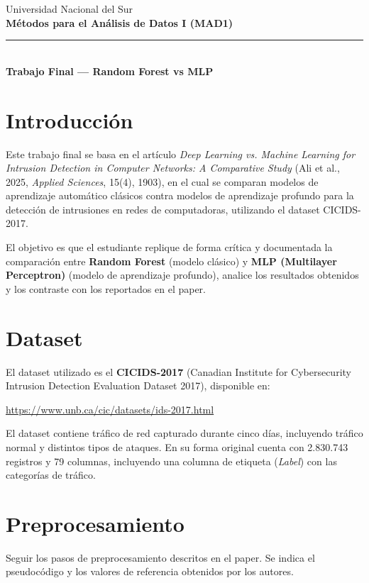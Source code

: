 \documentclass[11pt,a4paper]{article}
\begin{document}
\begin{center}
    {\color{azulUNS}\small Universidad Nacional del Sur}\\[2pt]
    {\color{azulUNS}\Large\bfseries M\'etodos para el An\'alisis de Datos I (MAD1)}\\[6pt]
    {\color{azulUNS}\rule{\textwidth}{1.2pt}}\\[8pt]
    {\Large\bfseries Trabajo Final --- Random Forest vs MLP}
\end{center}

\vspace{1em}

\section{Introducci\'on}
Este trabajo final se basa en el art\'iculo \textit{Deep Learning vs. Machine Learning for Intrusion Detection in Computer Networks: A Comparative Study} (Ali et al., 2025, \textit{Applied Sciences}, 15(4), 1903), en el cual se comparan modelos de aprendizaje autom\'atico cl\'asicos contra modelos de aprendizaje profundo para la detecci\'on de intrusiones en redes de computadoras, utilizando el dataset CICIDS-2017.

El objetivo es que el estudiante replique de forma cr\'itica y documentada la comparaci\'on entre \textbf{Random Forest} (modelo cl\'asico) y \textbf{MLP (Multilayer Perceptron)} (modelo de aprendizaje profundo), analice los resultados obtenidos y los contraste con los reportados en el paper.

\section{Dataset}
El dataset utilizado es el \textbf{CICIDS-2017} (Canadian Institute for Cybersecurity Intrusion Detection Evaluation Dataset 2017), disponible en:
\begin{center}
\url{https://www.unb.ca/cic/datasets/ids-2017.html}
\end{center}
El dataset contiene tr\'afico de red capturado durante cinco d\'ias, incluyendo tr\'afico normal y distintos tipos de ataques. En su forma original cuenta con 2.830.743 registros y 79 columnas, incluyendo una columna de etiqueta (\textit{Label}) con las categor\'ias de tr\'afico.

\section{Preprocesamiento}
Seguir los pasos de preprocesamiento descritos en el paper. Se indica el pseudoc\'odigo y los valores de referencia obtenidos por los autores.
\end{document}
